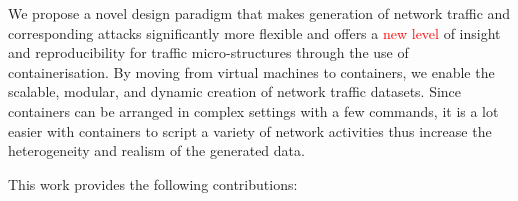 \documentclass{article}
\begin{document}


We propose a novel design paradigm that makes generation of network traffic and corresponding attacks significantly more flexible and offers a \textcolor{red}{new level} of insight and reproducibility for traffic micro-structures through the use of containerisation. By moving from virtual machines to containers, we enable the scalable, modular, and dynamic creation of network traffic datasets. Since containers can be arranged in complex settings with a few commands, it is a lot easier with containers to script a variety of network activities thus increase the heterogeneity and realism of the generated data.



This work provides the following contributions:
\end{document}
